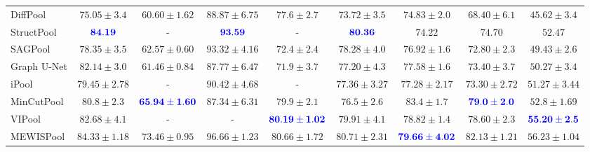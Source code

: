 \documentclass{article}
\begin{document}
\begin{table}[t]
{\begin{tabular}{lcccccccc}
			\large DiffPool\cite{diffpool} & \large $75.05 \pm 3.4$ & \large $60.60 \pm 1.62$ & \large $88.87 \pm 6.75$ & \large $77.6 \pm 2.7$ & \large $73.72 \pm 3.5$ & \large $74.83 \pm 2.0$ & \large $68.40 \pm 6.1$ & \large $45.62 \pm 3.4$ \vspace{0.2cm} \\
			\large StructPool\cite{structpool} & \large $\mathbf{\textcolor{blue}{84.19}}$ & \large - & \large $\mathbf{\textcolor{blue}{93.59}}$ & \large - & \large $\mathbf{\textcolor{blue}{80.36}}$ & \large $74.22$ & \large $74.70$ & \large $52.47$ \vspace{0.2cm} \\
			\large SAGPool\cite{sagpool} & \large $78.35 \pm 3.5$ & \large $62.57 \pm 0.60$ & \large $93.32 \pm 4.16$ & \large $72.4 \pm 2.4$ & \large $78.28 \pm 4.0$ & \large $76.92 \pm 1.6$ & \large $72.80 \pm 2.3$ & \large $49.43 \pm 2.6$ \vspace{0.2cm} \\
			\large Graph U-Net\cite{gunet} & \large $82.14 \pm 3.0$ & \large $61.46 \pm 0.84$ & \large $87.77 \pm 6.47$ & \large $71.9 \pm 3.7$ & \large $77.20 \pm 4.3$ & \large $77.58 \pm 1.6$ & \large $73.40 \pm 3.7$ & \large $50.27 \pm 3.4$ \vspace{0.2cm} \\
			\large iPool\cite{ipool} & \large $79.45 \pm 2.78$ & \large - & \large $90.42 \pm 4.68$ & \large - & \large $77.36 \pm 3.27$ & \large $77.28 \pm 2.17$ & \large $73.30 \pm 2.72$ & \large $51.27 \pm 3.44$ \vspace{0.2cm} \\
			\large MinCutPool\cite{mincutpool} & \large $80.8 \pm 2.3$ & \large $\mathbf{\textcolor{blue}{65.94 \pm 1.60}}$ & \large $87.34 \pm 6.31$ & \large $79.9 \pm 2.1$ & \large $76.5 \pm 2.6$ & \large $\mathbf{83.4 \pm 1.7}$ & \large $\mathbf{\textcolor{blue}{79.0 \pm 2.0}}$ & \large $52.8 \pm 1.69$ \vspace{0.2cm} \\
			\large VIPool\cite{gxn} & \large $82.68 \pm 4.1$ & \large - & \large - & \large $\mathbf{\textcolor{blue}{80.19 \pm 1.02}}$ & \large $79.91 \pm 4.1$ & \large $78.82 \pm 1.4$ & \large $78.60 \pm 2.3$ & \large $\mathbf{\textcolor{blue}{55.20 \pm 2.5}}$ \vspace{0.2cm} \\
			\midrule
			\large MEWISPool & \large $\mathbf{84.33 \pm 1.18}$ & \large $\mathbf{73.46 \pm 0.95}$ & \large $\mathbf{96.66 \pm 1.23}$ & \large $\mathbf{80.66 \pm 1.72}$ & \large $\mathbf{80.71 \pm 2.31}$ & \large $\mathbf{\textcolor{blue}{79.66 \pm 4.02}}$ & \large $\mathbf{82.13 \pm 1.21}$ & \large $\mathbf{56.23 \pm 1.04}$ \\
			\bottomrule
		\end{tabular}}
	\label{tab:graph_class}
\end{table}
\end{document}
